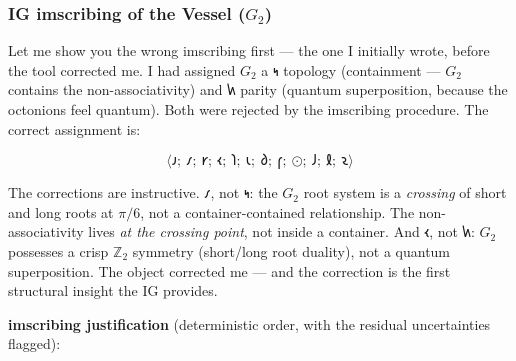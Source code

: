 \documentclass[12pt,a4paper]{article}
\begin{document}
\subsubsection{IG imscribing of the Vessel ($G_2$)}

Let me show you the wrong imscribing first --- the one I initially wrote, before the tool corrected me. I had assigned $G_2$ a $𐑰$ topology (containment --- $G_2$ contains the non-associativity) and $𐑿$ parity (quantum superposition, because the octonions feel quantum). Both were rejected by the imscribing procedure. The correct assignment is:

\[\langle 𐑨;\ 𐑥;\ 𐑾;\ 𐑬;\ 𐑐;\ 𐑧;\ 𐑔;\ 𐑝;\ ⊙;\ 𐑓;\ 𐑙;\ 𐑷 \rangle\]

The corrections are instructive. $𐑥$, not $𐑰$: the $G_2$ root system is a \emph{crossing} of short and long roots at $\pi/6$, not a container-contained relationship. The non-associativity lives \emph{at the crossing point}, not inside a container. And $𐑬$, not $𐑿$: $G_2$ possesses a crisp $\mathbb{Z}_2$ symmetry (short/long root duality), not a quantum superposition. The object corrected me --- and the correction is the first structural insight the IG provides.

\textbf{imscribing justification} (deterministic order, with the residual uncertainties flagged):
\end{document}
